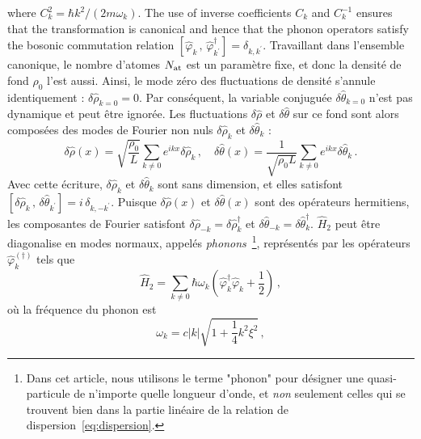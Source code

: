 \documentclass[aps,prd,notitlepage,amsfonts,amssymb,amsmath,nofootinbib,superscriptaddress,longbibliography]{revtex4-2}
\newcommand{\trad}[1]{\textcolor{tradcolor}{#1}}
\begin{document}
where $C_{k}^{2} = \hbar k^{2}/\left(2m \omega_{k}\right)$. The use of inverse coefficients $C_{k}$ and $C_{k}^{-1}$ ensures that the transformation is canonical and hence that the phonon operators satisfy the bosonic commutation relation $\left[ \hat{\varphi}_{k} \,,\, \hat{\varphi}_{k^{\prime}}^{\dagger} \right] = \delta_{k,k^{\prime}}$. 
\trad{
Travaillant dans l'ensemble canonique, 
le nombre d'atomes $N_{\rm at}$ est un paramètre fixe, et donc la densité de fond $\rho_{0}$ l'est aussi. Ainsi, le mode zéro des fluctuations de densité 
s'annule identiquement : $\delta \hat{\rho}_{k=0} = 0$. Par conséquent, la variable conjuguée 
$\delta \hat{\theta}_{k=0}$ n'est pas dynamique et peut être ignorée. Les fluctuations $\delta \hat{\rho}$ et $\delta \hat{\theta}$ sur ce fond sont alors composées des modes de Fourier non nuls $\delta \hat{\rho}_{k}$ et $\delta \hat{\theta}_{k}$ :
\begin{equation}
	\delta\hat{\rho}(x) = \sqrt{\frac{\rho_{0}}{L}} \sum_{k \neq 0} e^{i k x} \delta\hat{\rho}_{k} \,, \quad \delta\hat{\theta}(x) = \frac{1}{\sqrt{\rho_{0} L}} \sum_{k \neq 0} e^{i k x} \delta\hat{\theta}_{k} \,.
\end{equation}
Avec cette écriture, $\delta\hat{\rho}_{k}$ et $\delta\hat{\theta}_{k}$ sont sans dimension, et elles satisfont $\left[\delta\hat{\rho}_{k} \,,\, \delta\hat{\theta}_{k^{\prime}} \right] = i \, \delta_{k,-k^{\prime}}$. Puisque $\delta\hat{\rho}(x)$ et $\delta\hat{\theta}(x)$ sont des opérateurs hermitiens, les composantes de Fourier satisfont $\delta\hat{\rho}_{-k} = \delta\hat{\rho}_{k}^{\dagger}$ et $\delta\hat{\theta}_{-k} = \delta\hat{\theta}_{k}^{\dagger}$. $\hat{H}_{2}$ peut être diagonalise en modes normaux, appelés {\it phonons}~\footnote{Dans cet article, nous utilisons le terme "phonon" pour désigner une quasi-particule de n'importe quelle longueur d'onde, et \textit{non} seulement celles qui se trouvent bien dans la partie linéaire de la relation de dispersion~\eqref{eq:dispersion}.}, représentés par les opérateurs $\hat{\varphi}_{k}^{(\dagger)}$ tels que
\begin{equation}
	\hat{H}_{2} = \sum_{k \neq 0} \hbar \omega_{k} \left( \hat{\varphi}^{\dagger}_{k}\hat{\varphi}_{k} + \frac{1}{2} \right) \,, 
	\label{eq:Hamiltonian_quadratic}
\end{equation}
où la fréquence du phonon est
\begin{equation}
	\omega_{k} = c\left|k\right| \sqrt{1 + \frac{1}{4} k^{2} \xi^{2}} \,,
	\label{eq:dispersion}
\end{equation}
}
\end{document}

